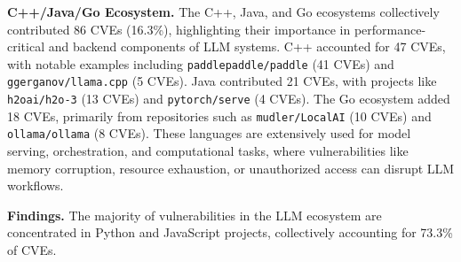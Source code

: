 \noindent \textbf{C++/Java/Go Ecosystem.} 
The C++, Java, and Go ecosystems collectively contributed 86 CVEs (16.3\%), highlighting their importance in performance-critical and backend components of LLM systems. C++ accounted for 47 CVEs, with notable examples including \texttt{paddlepaddle/paddle} (41 CVEs) and \texttt{ggerganov/llama.cpp} (5 CVEs). Java contributed 21 CVEs, with projects like \texttt{h2oai/h2o-3} (13 CVEs) and \texttt{pytorch/serve} (4 CVEs). The Go ecosystem added 18 CVEs, primarily from repositories such as \texttt{mudler/LocalAI} (10 CVEs) and \texttt{ollama/ollama} (8 CVEs). These languages are extensively used for model serving, orchestration, and computational tasks, where vulnerabilities like memory corruption, resource exhaustion, or unauthorized access can disrupt LLM workflows. 

\begin{tcolorbox}
    \textbf{Findings.} The majority of vulnerabilities in the LLM ecosystem are concentrated in Python and JavaScript projects, collectively accounting for 73.3\% of CVEs. 
\end{tcolorbox}